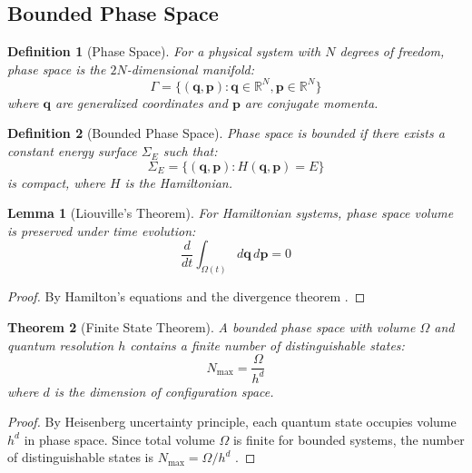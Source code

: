 \documentclass[twocolumn,10pt]{article}
\newtheorem{theorem}{Theorem}
\newtheorem{lemma}[theorem]{Lemma}
\newtheorem{definition}{Definition}
\begin{document}
\subsection{Bounded Phase Space}

\begin{definition}[Phase Space]
For a physical system with $N$ degrees of freedom, phase space is the $2N$-dimensional manifold:
\begin{equation}
\Gamma = \{(\mathbf{q}, \mathbf{p}) : \mathbf{q} \in \mathbb{R}^N, \mathbf{p} \in \mathbb{R}^N\}
\end{equation}
where $\mathbf{q}$ are generalized coordinates and $\mathbf{p}$ are conjugate momenta.
\end{definition}

\begin{definition}[Bounded Phase Space]
Phase space is bounded if there exists a constant energy surface $\Sigma_E$ such that:
\begin{equation}
\Sigma_E = \{(\mathbf{q}, \mathbf{p}) : H(\mathbf{q}, \mathbf{p}) = E\}
\end{equation}
is compact, where $H$ is the Hamiltonian.
\end{definition}

\begin{lemma}[Liouville's Theorem]
For Hamiltonian systems, phase space volume is preserved under time evolution:
\begin{equation}
\frac{d}{dt}\int_{\Omega(t)} d\mathbf{q}\,d\mathbf{p} = 0
\end{equation}
\end{lemma}

\begin{proof}
By Hamilton's equations and the divergence theorem \cite{Arnold1989}.
\end{proof}

\begin{theorem}[Finite State Theorem]
\label{thm:finite_states}
A bounded phase space with volume $\Omega$ and quantum resolution $h$ contains a finite number of distinguishable states:
\begin{equation}
N_{\text{max}} = \frac{\Omega}{h^d}
\end{equation}
where $d$ is the dimension of configuration space.
\end{theorem}

\begin{proof}
By Heisenberg uncertainty principle, each quantum state occupies volume $h^d$ in phase space. Since total volume $\Omega$ is finite for bounded systems, the number of distinguishable states is $N_{\text{max}} = \Omega/h^d$ \cite{Landau1980}.
\end{proof}
\end{document}
